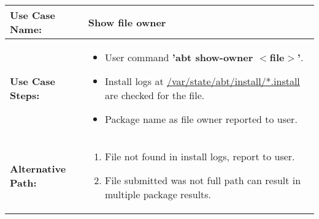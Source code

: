 \medskip

\begin{tabularx}{\linewidth}{|l|X|}
\hline
\textbf{Use Case Name:} & \textbf{Show file owner} \\
\hline
\textbf{Use Case Steps:} & 
\begin{minipage}{\linewidth} 
  \vspace{0.05em}
  \begin{itemize}
    \item User command \textbf{'abt show-owner $<$file$>$'}.
    \item Install logs at \url{/var/state/abt/install/*.install} are checked for the file.
    \item Package name as file owner reported to user.
  \end{itemize}
  \vspace{0.05em}
\end{minipage}
\\
\hline 
\textbf{Alternative Path:} &
\begin{minipage}{\linewidth}
  \vspace{0.05em} 
  \begin{enumerate}
    \item File not found in install logs, report to user.
    \item File submitted was not full path can result in multiple package results.
  \end{enumerate}
  \vspace{0.05em} 
\end{minipage}
\\
\hline
\end{tabularx}